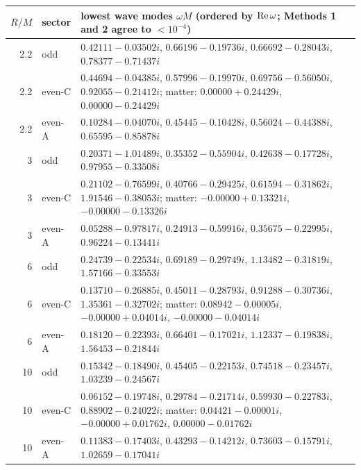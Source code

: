 \begin{tabular}{rlp{12cm}}\toprule
$R/M$ & sector & lowest wave modes $\omega M$ (ordered by ${\rm Re}\,\omega$; Methods 1 and 2 agree to $<10^{-4}$)\\\midrule
2.2 & odd & $0.42111-0.03502i$, $0.66196-0.19736i$, $0.66692-0.28043i$, $0.78377-0.71437i$ \\
2.2 & even-C & $0.44694-0.04385i$, $0.57996-0.19970i$, $0.69756-0.56050i$, $0.92055-0.21412i$; matter: $0.00000+0.24429i$, $0.00000-0.24429i$ \\
2.2 & even-A & $0.10284-0.04070i$, $0.45445-0.10428i$, $0.56024-0.44388i$, $0.65595-0.85878i$ \\
3 & odd & $0.20371-1.01489i$, $0.35352-0.55904i$, $0.42638-0.17728i$, $0.97955-0.33508i$ \\
3 & even-C & $0.21102-0.76599i$, $0.40766-0.29425i$, $0.61594-0.31862i$, $1.91546-0.38053i$; matter: $-0.00000+0.13321i$, $-0.00000-0.13326i$ \\
3 & even-A & $0.05288-0.97817i$, $0.24913-0.59916i$, $0.35675-0.22995i$, $0.96224-0.13441i$ \\
6 & odd & $0.24739-0.22534i$, $0.69189-0.29749i$, $1.13482-0.31819i$, $1.57166-0.33553i$ \\
6 & even-C & $0.13710-0.26885i$, $0.45011-0.28793i$, $0.91288-0.30736i$, $1.35361-0.32702i$; matter: $0.08942-0.00005i$, $-0.00000+0.04014i$, $-0.00000-0.04014i$ \\
6 & even-A & $0.18120-0.22393i$, $0.66401-0.17021i$, $1.12337-0.19838i$, $1.56453-0.21844i$ \\
10 & odd & $0.15342-0.18490i$, $0.45405-0.22153i$, $0.74518-0.23457i$, $1.03239-0.24567i$ \\
10 & even-C & $0.06152-0.19748i$, $0.29784-0.21714i$, $0.59930-0.22783i$, $0.88902-0.24022i$; matter: $0.04421-0.00001i$, $-0.00000+0.01762i$, $0.00000-0.01762i$ \\
10 & even-A & $0.11383-0.17403i$, $0.43293-0.14212i$, $0.73603-0.15791i$, $1.02659-0.17041i$ \\
\bottomrule\end{tabular}
